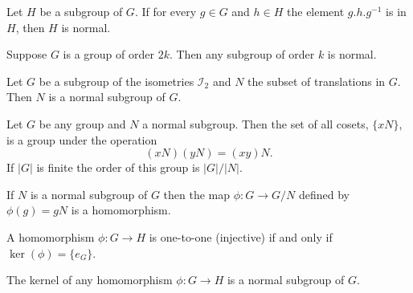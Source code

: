 
\begin{lemma}
    Let \(H\) be a subgroup of \(G\). If for every \(g \in G\) and \(h \in H\) the element \(g.h.g^{-1}\) is in \(H\), then \(H\) is normal.
\end{lemma}

\begin{proposition}
    Suppose \(G\) is a group of order \(2k\). Then any subgroup of order \(k\) is normal.
\end{proposition}

\begin{theorem}
    Let \(G\) be a subgroup of the isometries \(\mathcal{I_2}\) and \(N\) the subset of translations in \(G\). Then \(N\) is a normal subgroup of \(G\).
\end{theorem}

\begin{theorem}
    Let \(G\) be any group and \(N\) a normal subgroup. Then the set of all cosets, \(\{xN\}\), is a group under the operation
    \[(xN)(yN) = (xy)N.\]
    If \(|G|\) is finite the order of this group is \(|G| / |N|\).
\end{theorem}


\begin{theorem}
    If \(N\) is a normal subgroup of \(G\) then the map \(\phi: G \to G / N\) defined by \(\phi(g) = gN\) is a homomorphism.
\end{theorem}



\begin{proposition}
    A homomorphism \(\phi: G \to H\) is one-to-one (injective) if and only if \(\ker(\phi) = \{e_G\}\).
\end{proposition}

\begin{theorem}
    The kernel of any homomorphism \(\phi: G \to H\) is a normal subgroup of \(G\).
\end{theorem}

